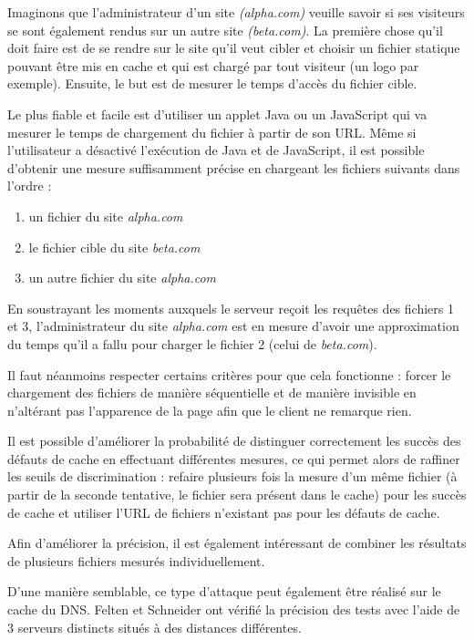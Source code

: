 Imaginons que l'administrateur d'un site \emph{(alpha.com)} veuille savoir si ses visiteurs se sont également rendus sur un autre site \emph{(beta.com)}. La première chose qu'il doit faire est de se rendre sur le site qu'il veut cibler et choisir un fichier statique pouvant être mis en cache et qui est chargé par tout visiteur (un logo par exemple). Ensuite, le but est de mesurer le temps d'accès du fichier cible.

Le plus fiable et facile est d'utiliser un applet Java ou un JavaScript qui va mesurer le temps de chargement du fichier à partir de son URL. Même si l'utilisateur a désactivé l'exécution de Java et de JavaScript, il est possible d'obtenir une mesure suffisamment précise en chargeant les fichiers suivants dans l'ordre :

\begin{enumerate}
  \item un fichier du site \emph{alpha.com}
  \item le fichier cible du site \emph{beta.com}
  \item un autre fichier du site \emph{alpha.com}
\end{enumerate}

En soustrayant les moments auxquels le serveur reçoit les requêtes des fichiers 1 et 3, l'administrateur du site \emph{alpha.com} est en mesure d'avoir une approximation du temps qu'il a fallu pour charger le fichier 2 (celui de \emph{beta.com}).

Il faut néanmoins respecter certains critères pour que cela fonctionne : forcer le chargement des fichiers de manière séquentielle et de manière invisible en n'altérant pas l'apparence de la page afin que le client ne remarque rien.
\newline

Il est possible d'améliorer la probabilité de distinguer correctement les succès des défauts de cache en effectuant différentes mesures, ce qui permet alors de raffiner les seuils de discrimination : refaire plusieurs fois la mesure d'un même fichier (à partir de la seconde tentative, le fichier sera présent dans le cache) pour les succès de cache et utiliser l'URL de fichiers n'existant pas pour les défauts de cache.

Afin d'améliorer la précision, il est également intéressant de combiner les résultats de plusieurs fichiers mesurés individuellement.
\newline

D'une manière semblable, ce type d'attaque peut également être réalisé sur le cache du DNS. Felten et Schneider ont vérifié la précision des tests avec l'aide de 3 serveurs distincts situés à des distances différentes.

